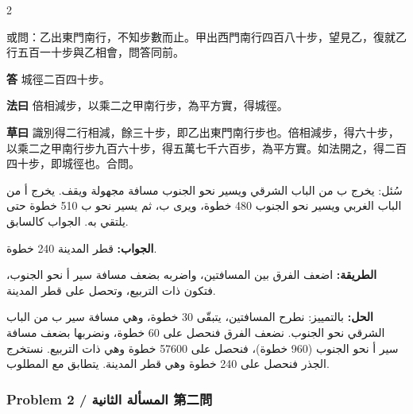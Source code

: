 \documentclass[11pt,a4paper]{article}
\newcommand{\ar}[1]{\arabicfont\beginR #1\endR}
\newcommand{\Answer}[1]{\par\noindent\textbf{\color{problemcolor}答} #1\par}
\newcommand{\Method}[1]{\par\noindent\textbf{\color{problemcolor}法曰} #1\par}
\newcommand{\Workings}[1]{\par\noindent\textbf{\color{problemcolor}草曰} #1\par}
\newcommand{\AnswerAr}{\par\noindent\textbf{\color{problemcolor}\ar{الجواب:}} }
\newcommand{\MethodAr}{\par\noindent\textbf{\color{problemcolor}\ar{الطريقة:}} }
\newcommand{\WorkingsAr}{\par\noindent\textbf{\color{problemcolor}\ar{الحل:}} }
\begin{document}
\begin{paracol}{2}

\noindent 或問：乙出東門南行，不知步數而止。甲出西門南行四百八十步，望見乙，復就乙行五百一十步與乙相會，問答同前。

\vspace{0.2cm}

\Answer{城徑二百四十步。}

\vspace{0.2cm}

\Method{倍相減步，以乘二之甲南行步，為平方實，得城徑。}

\vspace{0.2cm}

\Workings{識別得二行相減，餘三十步，即乙出東門南行步也。倍相減步，得六十步，以乘二之甲南行步九百六十步，得五萬七千六百步，為平方實。如法開之，得二百四十步，即城徑也。合問。}

\switchcolumn

\ar{سُئل: يخرج ب من الباب الشرقي ويسير نحو الجنوب مسافة مجهولة ويقف. يخرج أ من الباب الغربي ويسير نحو الجنوب 480 خطوة، ويرى ب، ثم يسير نحو ب 510 خطوة حتى يلتقي به. الجواب كالسابق.}

\vspace{0.2cm}

\AnswerAr{قطر المدينة 240 خطوة.}

\vspace{0.2cm}

\MethodAr{اضعف الفرق بين المسافتين، واضربه بضعف مسافة سير أ نحو الجنوب، فتكون ذات التربيع، وتحصل على قطر المدينة.}

\vspace{0.2cm}

\WorkingsAr{بالتمييز: نطرح المسافتين، يتبقّى 30 خطوة، وهي مسافة سير ب من الباب الشرقي نحو الجنوب. نضعف الفرق فنحصل على 60 خطوة، ونضربها بضعف مسافة سير أ نحو الجنوب (960 خطوة)، فنحصل على 57600 خطوة وهي ذات التربيع. نستخرج الجذر فنحصل على 240 خطوة وهي قطر المدينة. يتطابق مع المطلوب.}

\end{paracol}

\vspace{0.5cm}

\subsubsection*{Problem 2 / \ar{المسألة الثانية} \quad 第二問}
\end{document}
